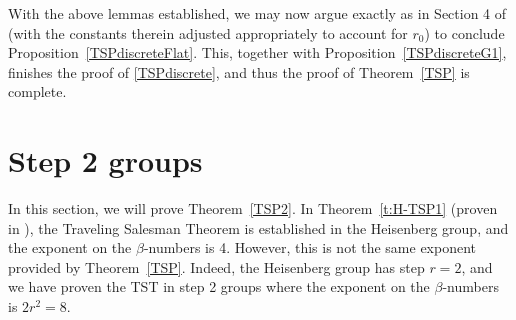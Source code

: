 \documentclass[11pt]{amsart}
\theoremstyle{definition}
\numberwithin{theorem}{section} \numberwithin{equation}{section}
\begin{document}
With the above lemmas established,
we may now argue exactly as in Section 4 of \cite{LiSchul}
(with the constants therein adjusted appropriately to account for $r_0$)
to conclude Proposition~\ref{TSPdiscreteFlat}.
This, together with Proposition~\ref{TSPdiscreteG1}, finishes the proof of \eqref{TSPdiscrete},
and thus the proof of Theorem~\ref{TSP} is complete.

















\section{Step 2 groups}
\label{Step2Sec}

In this section, we will prove Theorem~\ref{TSP2}.
In Theorem~\ref{t:H-TSP1} (proven in \cite{LiSchul}), 
the Traveling Salesman Theorem is established in the Heisenberg group, 
and the exponent on the $\beta$-numbers is 4.
However, this is not the same exponent provided by Theorem~\ref{TSP}.
Indeed, the Heisenberg group has step $r=2$, 
and we have proven the TST in step 2 groups 
where the exponent on the $\beta$-numbers is $2r^2 = 8$.
\end{document}
